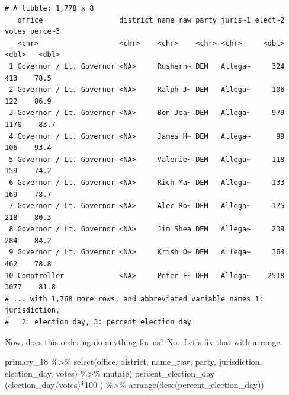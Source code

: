 \documentclass[
  letterpaper,
  DIV=11,
  numbers=noendperiod]{scrreprt}
\newenvironment{Shaded}{\begin{snugshade}}{\end{snugshade}}
\newcommand{\AttributeTok}[1]{\textcolor[rgb]{0.40,0.45,0.13}{#1}}
\newcommand{\DecValTok}[1]{\textcolor[rgb]{0.68,0.00,0.00}{#1}}
\newcommand{\FunctionTok}[1]{\textcolor[rgb]{0.28,0.35,0.67}{#1}}
\newcommand{\NormalTok}[1]{\textcolor[rgb]{0.00,0.23,0.31}{#1}}
\newcommand{\SpecialCharTok}[1]{\textcolor[rgb]{0.37,0.37,0.37}{#1}}
\begin{document}
\begin{verbatim}
# A tibble: 1,778 x 8
   office                  district name_raw party juris~1 elect~2 votes perce~3
   <chr>                   <chr>    <chr>    <chr> <chr>     <dbl> <dbl>   <dbl>
 1 Governor / Lt. Governor <NA>     Rushern~ DEM   Allega~     324   413    78.5
 2 Governor / Lt. Governor <NA>     Ralph J~ DEM   Allega~     106   122    86.9
 3 Governor / Lt. Governor <NA>     Ben Jea~ DEM   Allega~     979  1170    83.7
 4 Governor / Lt. Governor <NA>     James H~ DEM   Allega~      99   106    93.4
 5 Governor / Lt. Governor <NA>     Valerie~ DEM   Allega~     118   159    74.2
 6 Governor / Lt. Governor <NA>     Rich Ma~ DEM   Allega~     133   169    78.7
 7 Governor / Lt. Governor <NA>     Alec Ro~ DEM   Allega~     175   218    80.3
 8 Governor / Lt. Governor <NA>     Jim Shea DEM   Allega~     239   284    84.2
 9 Governor / Lt. Governor <NA>     Krish O~ DEM   Allega~     364   462    78.8
10 Comptroller             <NA>     Peter F~ DEM   Allega~    2518  3077    81.8
# ... with 1,768 more rows, and abbreviated variable names 1: jurisdiction,
#   2: election_day, 3: percent_election_day
\end{verbatim}

Now, does this ordering do anything for us? No.~Let's fix that with
arrange.

\begin{Shaded}
\begin{Highlighting}[]
\NormalTok{primary\_18 }\SpecialCharTok{\%\textgreater{}\%}
  \FunctionTok{select}\NormalTok{(office, district, name\_raw, party, jurisdiction, election\_day, votes) }\SpecialCharTok{\%\textgreater{}\%}
  \FunctionTok{mutate}\NormalTok{(}
  \AttributeTok{percent\_election\_day =}\NormalTok{ (election\_day}\SpecialCharTok{/}\NormalTok{votes)}\SpecialCharTok{*}\DecValTok{100}
\NormalTok{)  }\SpecialCharTok{\%\textgreater{}\%} \FunctionTok{arrange}\NormalTok{(}\FunctionTok{desc}\NormalTok{(percent\_election\_day))}
\end{Highlighting}
\end{Shaded}
\end{document}
